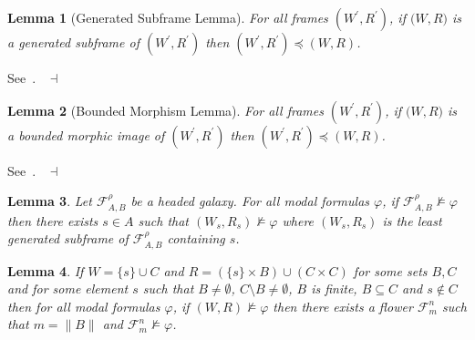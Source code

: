 \documentclass[draft]{article}
\newtheorem{lemma}{Lemma}
\newenvironment{proof}{{\bf Proof:}}{~$\dashv$\\}
\begin{document}
%
%
\begin{lemma}[Generated Subframe Lemma]\label{Generated:Subframe:Lemma}
%
%
For all frames $(W^{\prime},R^{\prime})$, if $(W,
%
%
%
%
%
%
%
%
%
%
%
%
$\linebreak$
%
%
%
%
%
%
%
%
%
%
%
%
R)$ is a generated subframe of $(W^{\prime},R^{\prime})$ then $(W^{\prime},R^{\prime}){\preceq}(W,R)$.
%
%
\end{lemma}
%
%
\begin{proof}
%
%
See~\cite[Chapter~$3$]{Blackburn:deRijke:Venema:2001}.
%
%
\medskip
%
%
\end{proof}
%
%
\begin{lemma}[Bounded Morphism Lemma]\label{Bounded:Morphism:Lemma}
%
%
For all frames $(W^{\prime},R^{\prime})$, if $(W,
%
%
%
%
%
%
%
%
%
%
%
%
$\linebreak$
%
%
%
%
%
%
%
%
%
%
%
%
R)$ is a bounded morphic image of $(W^{\prime},R^{\prime})$ then $(W^{\prime},R^{\prime}){\preceq}(W,R)$.
%
%
\end{lemma}
%
%
\begin{proof}
%
%
See~\cite[Chapter~$3$]{Blackburn:deRijke:Venema:2001}.
%
%
\medskip
%
%
\end{proof}
%
%
\begin{lemma}\label{lemma:sigma:about:K2:galaxies:and:generated:by:s:subframes}
%
%
Let ${\mathcal F}_{A,B}^{\rho}$ be a headed galaxy.
For all modal formulas $\varphi$, if ${\mathcal F}_{A,B}^{\rho}{\not\models}\varphi$ then there exists $s{\in}A$ such that $(W_{s},R_{s}){\not\models}\varphi$ where $(W_{s},R_{s})$ is the least generated subframe of ${\mathcal F}_{A,B}^{\rho}$ containing $s$.
%
%
\end{lemma}
%
%
%
%
%
%
%
%
\begin{lemma}\label{lemma:about:finite:subset:when:K5:shape:of:the:frame}
%
%
If $W{=}\{s\}{\cup}C$ and $R{=}(\{s\}{\times}B){\cup}(C{\times}C)$ for some sets $B,C$ and for some element $s$ such that $B{\not=}\emptyset$, $C{\setminus}B{\not=}\emptyset$, $B$ is finite, $B{\subseteq}C$ and $s{\not\in}C$ then for all modal formulas $\varphi$, if $(W,R){\not\models}\varphi$ then there exists a flower ${\mathcal F}_{m}^{n}$ such that $m{=}{\parallel}B{\parallel}$ and ${\mathcal F}_{m}^{n}{\not\models}\varphi$.
%
%
\end{lemma}
\end{document}
